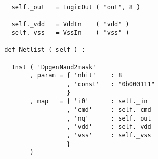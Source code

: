 \begin{itemize}
\begin{verbatim}
    self._out   = LogicOut ( "out", 8 )

    self._vdd   = VddIn    ( "vdd" )
    self._vss   = VssIn    ( "vss" )
    
  def Netlist ( self ) :
      
    Inst ( 'DpgenNand2mask'
         , param = { 'nbit'    : 8
                   , 'const'   : "0b000111"
                   }
         , map   = { 'i0'      : self._in
                   , 'cmd'     : self._cmd
                   , 'nq'      : self._out
                   , 'vdd'     : self._vdd
                   , 'vss'     : self._vss
                   }
         )
\end{verbatim}
\end{itemize}
